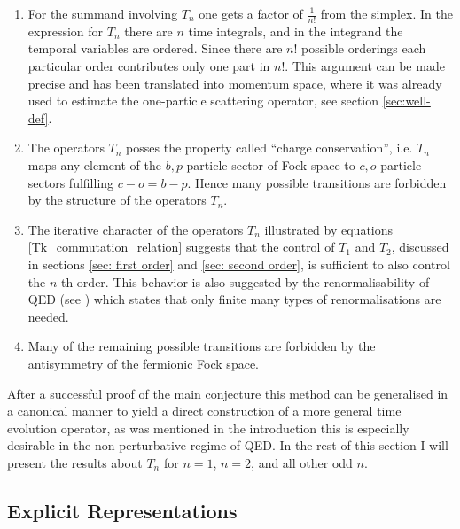 \documentclass[b5paper,draft,openbib,12pt]{memoir}
\begin{document}
\begin{enumerate}
\item For the summand involving \(T_n\) one gets a factor of \(\frac{1}{n!}\)
    from the simplex. In the expression for \(T_n\) there are \(n\) time
    integrals, and in the integrand the temporal variables are ordered. Since
    there are \(n!\) possible orderings each particular order contributes only
    one part in \(n!\). This argument can be made precise and has been
    translated into momentum space, where it was already used to estimate the
    one-particle scattering operator, see section \ref{sec:well-def}.
\item The operators \(T_n\) posses the property called ``charge conservation'',
    i.e. \(T_n\) maps any element of the \(b,p\) particle sector of Fock space
    to \(c,o\) particle sectors fulfilling \(c-o=b-p\). Hence many possible
    transitions are forbidden by the structure of the operators \(T_n\).
\item The iterative character of the operators \(T_n\) illustrated by equations \eqref{Tk_commutation_relation}
    suggests that the control of $T_1$ and $T_2$, discussed in sections \ref{sec: first order} and 
    \ref{sec: second order}, is sufficient to also control the $n$-th
    order. This behavior is also suggested by the renormalisability of QED (see \cite[Chapter
    4.3]{scharf2014finite}) which states that only finite many types of renormalisations
    are needed.
\item Many of the remaining possible transitions are forbidden by the
    antisymmetry of the fermionic Fock space.
\end{enumerate}

After a successful proof of the main conjecture this method can be generalised in a canonical manner to yield a direct construction of a more general time evolution operator, as was mentioned in the introduction this is especially desirable in the non-perturbative regime of QED.
In the rest of this section I will present the results about $T_n$ for $n=1$,
$n=2$, and all other odd $n$.

\subsection{Explicit Representations}\label{sec: explicit}
\end{document}
